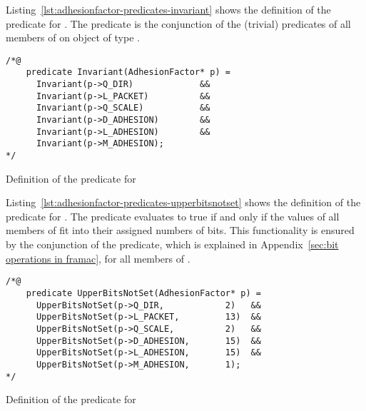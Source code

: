 \FloatBarrier

\label{sec:adhesionfactor-predicates-invariant}

Listing~\ref{lst:adhesionfactor-predicates-invariant} shows the definition of the
 predicate for .
The predicate is the conjunction of the (trivial)  predicates
of all members of on object of type .

\begin{listing}[hbt]
\begin{minipage}{0.99\textwidth}
\begin{lstlisting}[style=acsl-block]
/*@
    predicate Invariant(AdhesionFactor* p) =
      Invariant(p->Q_DIR)             &&
      Invariant(p->L_PACKET)          &&
      Invariant(p->Q_SCALE)           &&
      Invariant(p->D_ADHESION)        &&
      Invariant(p->L_ADHESION)        &&
      Invariant(p->M_ADHESION);
*/
\end{lstlisting}
\end{minipage}
\caption{\label{lst:adhesionfactor-predicates-invariant}Definition of the  predicate for }
\end{listing}

\FloatBarrier

\label{sec:adhesionfactor-predicates-upperbitsnotset}


Listing~\ref{lst:adhesionfactor-predicates-upperbitsnotset} shows the definition
of the  predicate for .
The predicate  evaluates to true
if and only if the values of all members of 
fit into their assigned numbers of bits.
This functionality is ensured by the conjunction of the  predicate,
which is explained in Appendix~\ref{sec:bit operations in framac}, for all members of .

\begin{listing}[hbt]
\begin{minipage}{0.99\textwidth}
\begin{lstlisting}[style=acsl-block]
/*@
    predicate UpperBitsNotSet(AdhesionFactor* p) =
      UpperBitsNotSet(p->Q_DIR,            2)   &&
      UpperBitsNotSet(p->L_PACKET,         13)  &&
      UpperBitsNotSet(p->Q_SCALE,          2)   &&
      UpperBitsNotSet(p->D_ADHESION,       15)  &&
      UpperBitsNotSet(p->L_ADHESION,       15)  &&
      UpperBitsNotSet(p->M_ADHESION,       1);
*/
\end{lstlisting}
\end{minipage}
\caption{\label{lst:adhesionfactor-predicates-upperbitsnotset}Definition of the  predicate for }
\end{listing}

